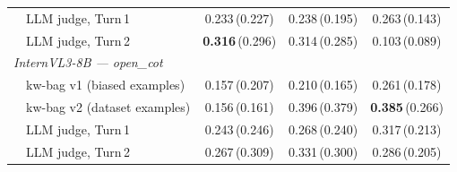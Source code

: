 \begin{table}[t]
\begin{tabular}{llccc}
                       & LLM judge, Turn\,1           & 0.233\,(0.227) & 0.238\,(0.195) & 0.263\,(0.143) \\
                       & LLM judge, Turn\,2           & \textbf{0.316}\,(0.296) & 0.314\,(0.285) & 0.103\,(0.089) \\
\midrule
\multicolumn{5}{l}{\textit{InternVL3-8B — open\_cot}} \\[2pt]
                       & kw-bag v1 (biased examples) & 0.157\,(0.207) & 0.210\,(0.165) & 0.261\,(0.178) \\
                       & kw-bag v2 (dataset examples) & 0.156\,(0.161) & 0.396\,(0.379) & \textbf{0.385}\,(0.266) \\
                       & LLM judge, Turn\,1           & 0.243\,(0.246) & 0.268\,(0.240) & 0.317\,(0.213) \\
                       & LLM judge, Turn\,2           & 0.267\,(0.309) & 0.331\,(0.300) & 0.286\,(0.205) \\
\bottomrule
\end{tabular}
\end{table}